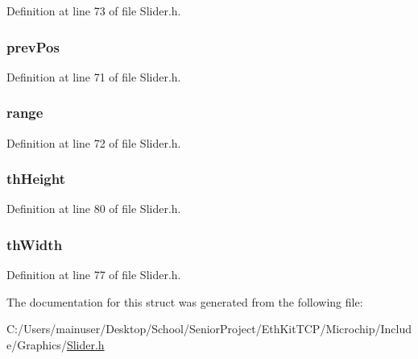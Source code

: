 Definition at line 73 of file Slider.\+h.

\hypertarget{struct_s_l_i_d_e_r_ae5ba3b8b09a4e59718a9e126fab813fe}{}
\subsubsection[{prev\+Pos}]{ prev\+Pos}\label{struct_s_l_i_d_e_r_ae5ba3b8b09a4e59718a9e126fab813fe}


Definition at line 71 of file Slider.\+h.

\hypertarget{struct_s_l_i_d_e_r_ab4dbd97dae01a95fd9e0deea02589374}{}
\subsubsection[{range}]{ range}\label{struct_s_l_i_d_e_r_ab4dbd97dae01a95fd9e0deea02589374}


Definition at line 72 of file Slider.\+h.

\hypertarget{struct_s_l_i_d_e_r_a43b8b68f2449553fb168faac121e83c9}{}
\subsubsection[{th\+Height}]{ th\+Height}\label{struct_s_l_i_d_e_r_a43b8b68f2449553fb168faac121e83c9}


Definition at line 80 of file Slider.\+h.

\hypertarget{struct_s_l_i_d_e_r_abf272f22369db6587c47afa50b4ca19e}{}
\subsubsection[{th\+Width}]{ th\+Width}\label{struct_s_l_i_d_e_r_abf272f22369db6587c47afa50b4ca19e}


Definition at line 77 of file Slider.\+h.



The documentation for this struct was generated from the following file\+:\begin{DoxyCompactItemize}
\item 
C\+:/\+Users/mainuser/\+Desktop/\+School/\+Senior\+Project/\+Eth\+Kit\+T\+C\+P/\+Microchip/\+Include/\+Graphics/\hyperlink{_slider_8h}{Slider.\+h}\end{DoxyCompactItemize}
